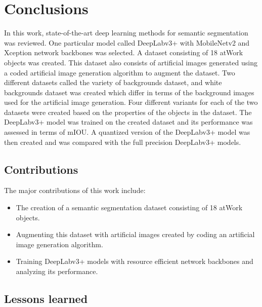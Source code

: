 
\chapter{Conclusions}

In this work, state-of-the-art deep learning methods for semantic segmentation was reviewed. One particular model called DeepLabv3+ with MobileNetv2 and Xception network backbones was selected. A dataset consisting of 18 atWork objects was created. This dataset also consists of artificial images generated using a coded artificial image generation algorithm to augment the dataset. Two different datasets called the variety of backgrounds dataset, and white backgrounds dataset was created which differ in terms of the background images used for the artificial image generation. Four different variants for each of the two datasets were created based on the properties of the objects in the dataset. The DeepLabv3+ model was trained on the created dataset and its performance was assessed in terms of mIOU. A quantized version of the DeepLabv3+ model was then created and was compared with the full precision DeepLabv3+ models.

\section{Contributions}

The major contributions of this work include:
	\begin{itemize}
		\item The creation of a semantic segmentation dataset consisting of 18 atWork objects.
		\item Augmenting this dataset with artificial images created by coding an artificial image generation algorithm.
		\item Training DeepLabv3+ models with resource efficient network backbones and analyzing its performance.
	\end{itemize}

\section{Lessons learned}

